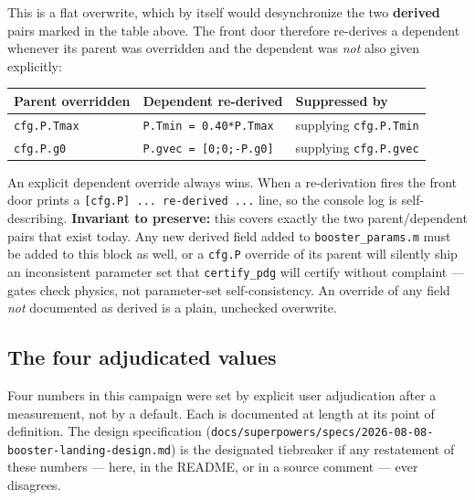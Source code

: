 \documentclass[11pt]{article}
\newcommand{\file}[1]{\texttt{#1}}
\begin{document}
This is a flat overwrite, which by itself would desynchronize the two
\textbf{derived} pairs marked in the table above. The front door therefore
re-derives a dependent whenever its parent was overridden and the dependent
was \emph{not} also given explicitly:

\begin{center}
\begin{tabular}{@{}lll@{}}
\toprule
Parent overridden & Dependent re-derived & Suppressed by \\
\midrule
\texttt{cfg.P.Tmax} & \texttt{P.Tmin = 0.40*P.Tmax} &
  supplying \texttt{cfg.P.Tmin} \\
\texttt{cfg.P.g0}   & \texttt{P.gvec = [0;0;-P.g0]} &
  supplying \texttt{cfg.P.gvec} \\
\bottomrule
\end{tabular}
\end{center}

An explicit dependent override always wins. When a re-derivation fires the
front door prints a \texttt{[cfg.P] ... re-derived ...} line, so the console
log is self-describing. \textbf{Invariant to preserve:} this covers exactly
the two parent/dependent pairs that exist today. Any new derived field added
to \file{booster\_params.m} must be added to this block as well, or a
\texttt{cfg.P} override of its parent will silently ship an inconsistent
parameter set that \texttt{certify\_pdg} will certify without complaint ---
gates check physics, not parameter-set self-consistency. An override of any
field \emph{not} documented as derived is a plain, unchecked overwrite.

\subsection{The four adjudicated values}
\label{sec:params:adj}

Four numbers in this campaign were set by explicit user adjudication after a
measurement, not by a default. Each is documented at length at its point of
definition. The design specification
(\file{docs/superpowers/specs/2026-08-08-booster-landing-design.md}) is the
designated tiebreaker if any restatement of these numbers --- here, in the
README, or in a source comment --- ever disagrees.
\end{document}
